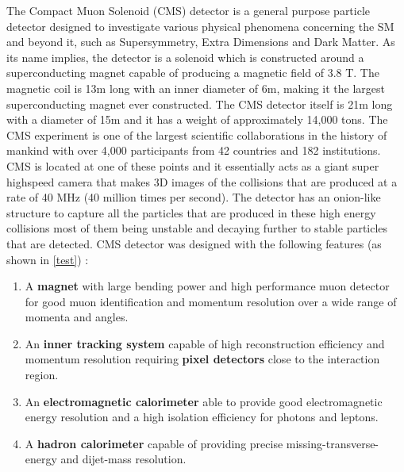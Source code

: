 
The Compact Muon Solenoid (CMS) detector is a general purpose particle detector designed to investigate various physical phenomena concerning the SM and beyond it, such as Supersymmetry, Extra Dimensions and Dark Matter. As its name implies, the detector is a solenoid which is  constructed around a superconducting magnet capable of producing a magnetic field of 3.8 T. The magnetic coil is 13m long with an inner diameter of 6m, making it the largest superconducting magnet ever constructed. The CMS detector itself is 21m long with a diameter of 15m and it has a weight of approximately 14,000 tons. The CMS experiment is one of the largest scientific collaborations in the history of mankind with over 4,000 participants from 42 countries and 182 institutions. CMS is located at one of these points and it essentially acts as a giant super highspeed camera that makes 3D images of the collisions that are produced at a rate of 40 MHz (40 million times per second). The detector has an onion-like structure to capture all the particles that are produced in these high energy collisions most of them being unstable and decaying further to stable particles that are detected.  CMS detector was designed with the following features (as shown in \autoref{test}) :

\begin{enumerate}
	\item{A \textbf{magnet} with large bending power and high performance muon detector for good muon
identification and momentum resolution over a wide range of momenta and angles.}

	\item{An \textbf{inner tracking system} capable of high reconstruction efficiency and momentum resolution
requiring \textbf{pixel detectors} close to the interaction region.}

	\item{An \textbf{electromagnetic calorimeter} able to provide good electromagnetic energy resolution and  
a high isolation efficiency for photons and leptons.}

	\item{A \textbf{hadron calorimeter} capable of providing precise missing-transverse-energy and dijet-mass  
resolution.}

\end{enumerate}

